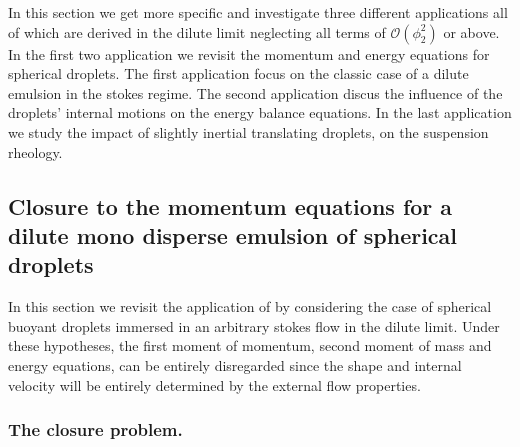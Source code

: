 
In this section we get more specific and investigate three different applications all of which are derived in the dilute limit neglecting all terms of $\mathcal{O}(\phi_2^2)$ or above.
In the first two application we revisit the momentum and energy equations for spherical droplets.
The first application focus on the classic case of a dilute emulsion in the stokes regime. 
The second application discus the influence of the droplets' internal motions on the energy balance equations. 
In the last application we study the impact of slightly inertial translating droplets, on the suspension rheology. 


\subsection{Closure to the momentum equations for a dilute mono disperse emulsion of spherical droplets}
In this section we revisit the application of  \citet[Appendix A]{zhang1997momentum} by considering the case of spherical buoyant droplets immersed in an arbitrary stokes flow in the dilute limit. 
Under these hypotheses, the first moment of momentum, second moment of mass and energy equations, can be entirely disregarded since the shape and internal velocity will be entirely determined by the external flow properties. 

\subsubsection*{The closure problem. }


